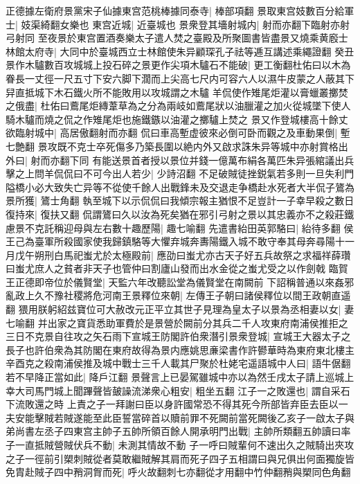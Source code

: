 正德據左衛府景黨宋子仙據東宫范桃棒據同泰寺|{
	棒部項翻}
景取東宫妓數百分給軍士|{
	妓渠綺翻女樂也}
東宫近城|{
	近臺城也}
景衆登其墻射城内|{
	射而亦翻下臨射亦射弓射同}
至夜景於東宫置酒奏樂太子遣人焚之臺殿及所聚圖書皆盡景又燒乘黄廏士林館太府寺|{
	大同中於臺城西立士林館使朱异顧琛孔子祛等逓互講述乘繩證翻}
癸丑景作木驢數百攻城城上投石碎之景更作尖項木驢石不能破|{
	更工衡翻杜佑曰以木為眷長一丈徑一尺五寸下安六脚下濶而上尖高七尺内可容六人以濕牛皮蒙之人蔽其下舁直抵城下木石鐵火所不能敗用以攻城謂之木驢}
羊侃使作雉尾炬灌以膏蠟叢擲焚之俄盡|{
	杜佑曰鷰尾炬縳葦草為之分為兩岐如鷰尾狀以油臘灌之加火從城墜下使人騎木驢而燒之侃之作雉尾炬也施鐵鏃以油灌之擲驢上焚之}
景又作登城樓高十餘丈欲臨射城中|{
	高居傲翻射而亦翻}
侃曰車高塹虚彼來必倒可卧而觀之及車動果倒|{
	塹七艶翻}
景攻既不克士卒死傷多乃築長圍以絶内外又啟求誅朱异等城中亦射賞格出外曰|{
	射而亦翻下同}
有能送景首者授以景位并錢一億萬布絹各萬匹朱异張綰議出兵擊之上問羊侃侃曰不可今出人若少|{
	少詩沼翻}
不足破賊徒挫鋭氣若多則一旦失利門隘橋小必大致失亡异等不從使千餘人出戰鋒未及交退走争橋赴水死者大半侃子鷟為景所獲|{
	鷟士角翻}
執至城下以示侃侃曰我傾宗報主猶恨不足豈計一子幸早殺之數日復持來|{
	復扶又翻}
侃謂鷟曰久以汝為死矣猶在邪引弓射之景以其忠義亦不之殺莊鐵慮景不克託稱迎母與左右數十趣歷陽|{
	趣七喻翻}
先遣書紿田英郭駱曰|{
	紿待多翻}
侯王己為臺軍所殺國家使我歸鎮駱等大懼弃城奔夀陽鐵入城不敢守奉其母奔尋陽十一月戊午朔刑白馬祀蚩尤於太極殿前|{
	應劭曰蚩尤亦古天子好五兵故祭之求福祥薛瓚曰蚩尤庶人之貧者非天子也管仲曰割廬山發而出水金從之蚩尤受之以作劍戟}
臨賀王正德即帝位於儀賢堂|{
	天監六年改聽訟堂為儀賢堂在南闕前}
下詔稱普通以來姦邪亂政上久不豫社稷將危河南王景釋位來朝|{
	左傳王子朝曰諸侯釋位以間王政朝直遥翻}
猥用朕躬紹兹寶位可大赦改元正平立其世子見理為皇太子以景為丞相妻以女|{
	妻七喻翻}
并出家之寶貨悉助軍費於是景營於闕前分其兵二千人攻東府南浦侯推拒之三日不克景自往攻之矢石雨下宣城王防閣許伯衆潛引景衆登城|{
	宣城王大器太子之長子也許伯衆為其防閣在東府故得為景内應姚思亷梁書作許鬰華時為東府東北樓主}
辛酉克之殺南浦侯推及城中戰士三千人載其尸聚於杜姥宅遥語城中人曰|{
	語牛倨翻}
若不早降正當如此|{
	降戶江翻}
景聲言上已晏駕雖城中亦以為然壬戌太子請上巡城上幸大司馬門城上聞蹕聲皆皷譟流涕衆心粗安|{
	粗坐五翻}
江子一之敗還也|{
	謂自采石下流敗還之時}
上責之子一拜謝曰臣以身許國常恐不得其死今所部皆弃臣去臣以一夫安能擊賊若賊遂能至此臣誓當碎首以贖前罪不死闕前當死闕後乙亥子一啟太子與弟尚書左丞子四東宫主帥子五帥所領百餘人開承明門出戰|{
	主帥所類翻五帥讀曰率}
子一直抵賊營賊伏兵不動|{
	未測其情故不動}
子一呼曰賊輩何不速出久之賊騎出夾攻之子一徑前引槊刺賊從者莫敢繼賊解其肩而死子四子五相謂曰與兄俱出何面獨旋皆免胄赴賊子四中矟洞胷而死|{
	呼火故翻刺七亦翻從才用翻中竹仲翻矟與槊同色角翻}
